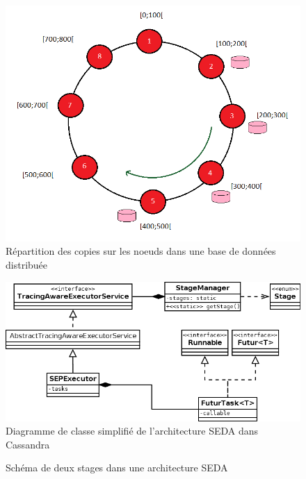 \documentclass[12pt]{article}
\begin{document}
\begin{figure}[H]
	\centering
        \includegraphics[width=12cm]{images/besoins/replication.png}
    \caption{Répartition des copies sur les noeuds dans une base de données distribuée \label{fig:replication}}
\end{figure}

\clearpage


\begin{figure}[p]
	\centering
		\includegraphics[width=15cm]{images/architecture/stages_diagram.png}
	\caption{Diagramme de classe simplifié de l'architecture SEDA dans Cassandra \label{fig:stages_diagram}}
\end{figure}

\begin{figure}[p]
	\centering
		
	\caption{Schéma de deux stages dans une architecture SEDA \label{fig:stages}}
\end{figure}
\end{document}
